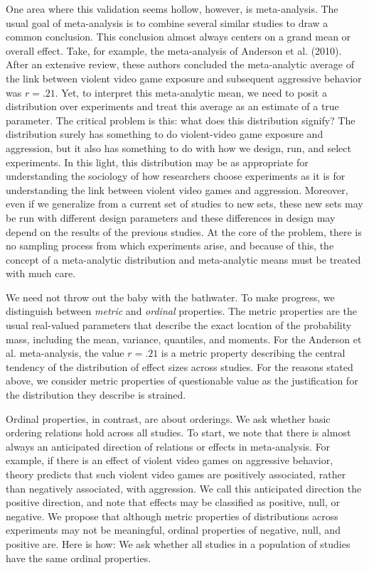 \documentclass[english,man]{apa6}
\newcounter{author}
\theoremstyle{definition}
\theoremstyle{definition}
\theoremstyle{remark}
\begin{document}
One area where this validation seems hollow, however, is meta-analysis.
The usual goal of meta-analysis is to combine several similar studies to
draw a common conclusion. This conclusion almost always centers on a
grand mean or overall effect. Take, for example, the meta-analysis of
Anderson et al. (2010). After an extensive review, these authors
concluded the meta-analytic average of the link between violent video
game exposure and subsequent aggressive behavior was \(r=.21\). Yet, to
interpret this meta-analytic mean, we need to posit a distribution over
experiments and treat this average as an estimate of a true parameter.
The critical problem is this: what does this distribution signify? The
distribution surely has something to do violent-video game exposure and
aggression, but it also has something to do with how we design, run, and
select experiments. In this light, this distribution may be as
appropriate for understanding the sociology of how researchers choose
experiments as it is for understanding the link between violent video
games and aggression. Moreover, even if we generalize from a current set
of studies to new sets, these new sets may be run with different design
parameters and these differences in design may depend on the results of
the previous studies. At the core of the problem, there is no sampling
process from which experiments arise, and because of this, the concept
of a meta-analytic distribution and meta-analytic means must be treated
with much care.

We need not throw out the baby with the bathwater. To make progress, we
distinguish between \emph{metric} and \emph{ordinal} properties. The
metric properties are the usual real-valued parameters that describe the
exact location of the probability mass, including the mean, variance,
quantiles, and moments. For the Anderson et al. meta-analysis, the value
\(r=.21\) is a metric property describing the central tendency of the
distribution of effect sizes across studies. For the reasons stated
above, we consider metric properties of questionable value as the
justification for the distribution they describe is strained.

Ordinal properties, in contrast, are about orderings. We ask whether
basic ordering relations hold across all studies. To start, we note that
there is almost always an anticipated direction of relations or effects
in meta-analysis. For example, if there is an effect of violent video
games on aggressive behavior, theory predicts that such violent video
games are positively associated, rather than negatively associated, with
aggression. We call this anticipated direction the positive direction,
and note that effects may be classified as positive, null, or negative.
We propose that although metric properties of distributions across
experiments may not be meaningful, ordinal properties of negative, null,
and positive are. Here is how: We ask whether all studies in a
population of studies have the same ordinal properties.
\end{document}
